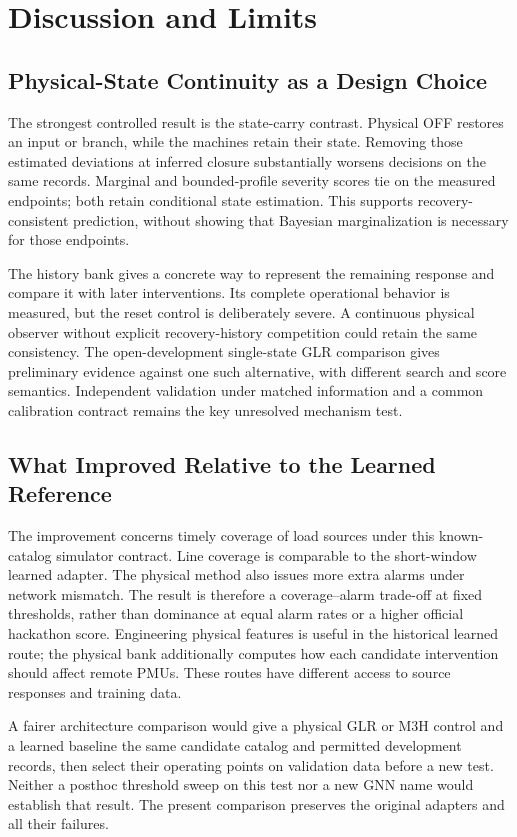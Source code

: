 \section{Discussion and Limits}
\label{sec:discussion}

\subsection{Physical-State Continuity as a Design Choice}
The strongest controlled result is the state-carry contrast. Physical OFF
restores an input or branch, while the machines retain their state.
Removing those estimated deviations at inferred closure substantially
worsens decisions on the same records. Marginal and bounded-profile
severity scores tie on the measured endpoints; both retain conditional
state estimation. This supports recovery-consistent prediction, without
showing that Bayesian marginalization is necessary for those endpoints.

The history bank gives a concrete way to represent the remaining response
and compare it with later interventions. Its complete operational behavior
is measured, but the reset control is deliberately severe. A continuous
physical observer without explicit recovery-history competition could
retain the same consistency. The open-development single-state GLR comparison gives preliminary
evidence against one such alternative, with different search and score
semantics. Independent validation under matched information and a common
calibration contract remains the key unresolved mechanism test.

\subsection{What Improved Relative to the Learned Reference}
The improvement concerns timely coverage of load sources under this
known-catalog simulator contract. Line coverage is comparable to the
short-window learned adapter. The physical method also issues more extra
alarms under network mismatch. The result is therefore a coverage--alarm
trade-off at fixed thresholds, rather than dominance at equal alarm rates
or a higher official hackathon score. Engineering physical features is
useful in the historical learned route; the physical bank additionally
computes how each candidate intervention should affect remote PMUs.
These routes have different access to source responses and training data.

A fairer architecture comparison would give a physical GLR or M3H control
and a learned baseline the same candidate catalog and permitted development
records, then select their operating points on validation data before a
new test. Neither a posthoc threshold sweep on this test nor a new GNN name
would establish that result. The present comparison preserves the original
adapters and all their failures.

